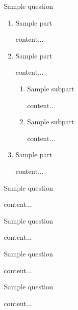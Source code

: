 \documentclass[11pt]{article} %
\begin{document}
	\begin{qstn}[5][][10]
		Sample question
	\begin{enumerate}[label=\protect\circled{\Alph*}]
		\item Sample part
		\begin{soln}
			content...
		\end{soln}
		\item Sample part
		\begin{soln}
			content...
		\end{soln}
		\begin{enumerate}[label=\protect\circled{\roman*}]
			\item Sample subpart
			\begin{soln}
				content...
			\end{soln}
			\item Sample subpart
			\begin{soln}
				content...
			\end{soln}
		\end{enumerate}
		\item Sample part
		\begin{soln}
			content...
		\end{soln}
	\end{enumerate}
	\end{qstn}
	
	\begin{qstn}[6][][10]
		Sample question
	\begin{soln}
		content...
	\end{soln}
	\end{qstn}
	
	\begin{qstn}[7][][10]
		Sample question
	\begin{soln}
		content...
	\end{soln}
	\end{qstn}
	
	\begin{qstn}[8][][10]
		Sample question
	\begin{soln}
		content...
	\end{soln}
	\end{qstn}
	
	\begin{qstn}[9][][10]
		Sample question
	\begin{soln}
		content...
	\end{soln}
	\end{qstn}
	
\end{document}
